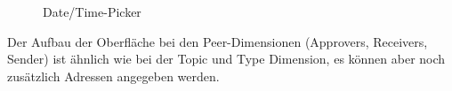 \hspace*{1em}
\begin{minipage}{0.47\linewidth}
	\begin{figure}[H]
		\centering
		\caption{Date/Time-Picker}
		\label{fig:time2}
	\end{figure}
\end{minipage}
\newline\newline\newline Der Aufbau der Oberfläche bei den Peer-Dimensionen (Approvers, Receivers, Sender) ist ähnlich wie bei der Topic und Type Dimension, es können aber noch zusätzlich Adressen angegeben werden. 
